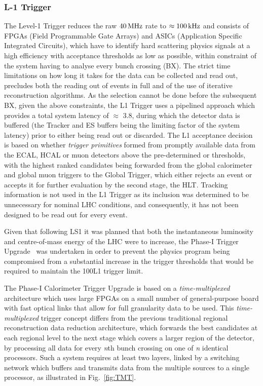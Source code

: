 \subsubsection{L-1 Trigger}\label{paragraph:L1}
The Level-1 Trigger reduces the raw $40\text{\,MHz}$ rate to $\approx100\text{\,kHz}$ and consists of FPGAs (Field Programmable Gate Arrays) and ASICs (Application Specific Integrated Circuits), which have to identify hard scattering physics signals at a high efficiency with acceptance thresholds as low as possible, within constraint of the system having to analyse every bunch crossing (BX).
The strict time limitations on how long it takes for the data can be collected and read out, precludes both the reading out of events in full and of the use of iterative reconstruction algorithms.
As the selection cannot be done before the subsequent BX, given the above constraints, the L1 Trigger uses a pipelined approach which provides a total system latency of $\approx$ 3.8\mus, during which the detector data is buffered (the Tracker and ES buffers being the limiting factor of the system latency) prior to either being read out or discarded.
The L1 acceptance decision is based on whether \emph{trigger primitives} formed from promptly available data from the ECAL, HCAL or muon detectors above the pre-determined \pT or \ET thresholds, with the highest ranked candidates being forwarded from the global calorimeter and global muon triggers to the Global Trigger, which either rejects an event or accepts it for further evaluation by the second stage, the HLT.
Tracking information is not used in the L1 Trigger as its inclusion was determined to be unnecessary for nominal LHC conditions, and consequently, it has not been designed to be read out for every event.

Given that following LS1 it was planned that both the instantaneous luminosity and centre-of-mass energy of the LHC were to increase, the Phase-I Trigger Upgrade~\cite{Tapper:2013yva} was undertaken in order to prevent the physics program being compromised from a substantial increase in the trigger thresholds that would be required to maintain the 100\kHz L1 trigger limit.	

The Phase-I Calorimeter Trigger Upgrade is based on a \emph{time-multiplexed} architecture which uses large FPGAs on a small number of general-purpose board with fast optical links that allow for full granularity data to be used.
This \emph{time-multiplexed} trigger concept differs from the previous traditional regional reconstruction data reduction architecture, which forwards the best candidates at each regional level to the next stage which covers a larger region of the detector, by processing all data for every \emph{n}th bunch crossing on one of \emph{n} identical processors.
Such a system requires at least two layers, linked by a switching network which buffers and transmits data from the multiple sources to a single processor, as illustrated in Fig.~\ref{fig:TMT}.

